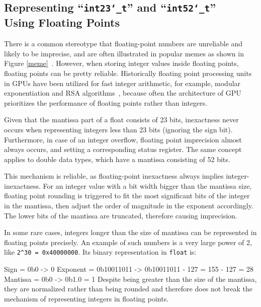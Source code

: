 \documentclass[logo,bsc,singlespacing,parskip]{infthesis}
\newcommand{\dtfloat}{\texttt{float}}
\newcommand{\dtfloati}{\texttt{int23\char`_t}}
\newcommand{\dtdoublei}{\texttt{int52\char`_t}}
\newenvironment{VerbatimCompact}
  {\vspace*{-2.5mm}\VerbatimEnvironment
   \par\Verbatim}
  {\endVerbatim\vspace*{-2.4mm}}
\begin{document}
\subsection{Representing ``\dtfloati{}'' and ``\dtdoublei{}'' \\ Using Floating Points}
\label{sec:fpe2}

There is a common stereotype that floating-point numbers are unreliable and
likely to be imprecise, and are often illustrated in popular memes as shown in
Figure \ref{meme}~\cite{meme}. However, when storing integer values inside
floating points, floating points can be pretty reliable. Historically
floating point processing units in GPUs have been utilized for fast integer
arithmetic, for example, modular exponentiation \cite{intfpu-modexp} and RSA
algorithms~\cite{intfpu-rsa}, because often the architecture of GPU prioritizes
the performance of floating points rather than integers. 

Given that the mantissa part of a float consists of 23 bits,
inexactness never occurs when representing integers less than 23 bits (ignoring
the sign bit). Furthermore, in case of an integer overflow, floating point
imprecision almost always occurs, and setting a corresponding status register.
The same concept applies to double data types, which have a mantissa consisting
of 52 bits.

This mechanism is reliable, as floating-point inexactness always implies 
integer\linebreak-inexactness. For an integer value with a bit width bigger than the
mantissa size, floating point rounding is triggered to fit the most
significant bits of the integer in the mantissa, then adjust the order of
magnitude in the exponent accordingly. The lower bits of the mantissa are
truncated, therefore causing imprecision. 

In some rare cases, integers longer than the size of mantissa can be represented
in floating points precisely. An example of such numbers is a very large power
of 2, like \texttt{2\^{}30 = 0x40000000}. Its binary representation in
\dtfloat{} is:
\begin{VerbatimCompact}
Sign     = 0b0        -> 0     
Exponent = 0b10011011 -> 0b10011011 - 127 = 155 - 127 = 28             
Mantissa = 0b0        -> 0b1.0 = 1
\end{VerbatimCompact}
Despite being greater than the size of
the mantissa, they are normalized rather than being rounded and therefore does
not break the mechanism of representing integers in floating points.
\end{document}
